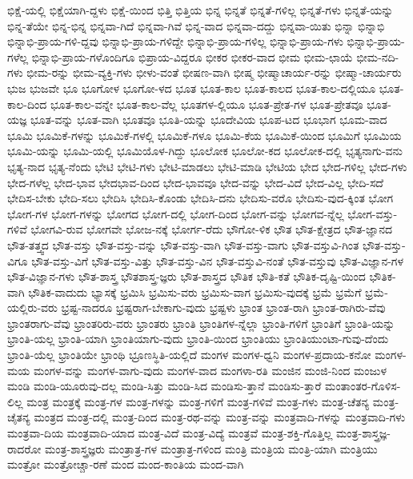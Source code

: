 {ಭಿಕ್ಷೆ-ಯಲ್ಲಿ
ಭಿಕ್ಷೆಯಾಗಿ-ದ್ದಳು
ಭಿಕ್ಷೆ-ಯಿಂದ
ಭಿತ್ತಿ
ಭಿತ್ತಿಯ
ಭಿನ್ನ
ಭಿನ್ನತೆ
ಭಿನ್ನತೆ-ಗಳಿಲ್ಲ
ಭಿನ್ನತೆ-ಗಳು
ಭಿನ್ನತೆ-ಯನ್ನು
ಭಿನ್ನ-ತೆಯೇ
ಭಿನ್ನ-ಭಿನ್ನ
ಭಿನ್ನವಾ-ಗಿದೆ
ಭಿನ್ನವಾ-ಗಿವೆ
ಭಿನ್ನ-ವಾದ
ಭಿನ್ನವಾ-ದದ್ದು
ಭಿನ್ನವಾ-ಯಿತು
ಭಿನ್ನಾ
ಭಿನ್ನಾಭಿ
ಭಿನ್ನಾಭಿ-ಪ್ರಾಯ-ಗಳಿ-ದ್ದವು
ಭಿನ್ನಾಭಿ-ಪ್ರಾಯ-ಗಳಿದ್ದೇ
ಭಿನ್ನಾಭಿ-ಪ್ರಾಯ-ಗಳಿಲ್ಲ
ಭಿನ್ನಾಭಿ-ಪ್ರಾಯ-ಗಳು
ಭಿನ್ನಾಭಿ-ಪ್ರಾಯ-ಗಳೆಲ್ಲ
ಭಿನ್ನಾಭಿ-ಪ್ರಾಯ-ಗಳೊಂದಿಗೂ
ಭಿಪ್ರಾಯ-ವಿದ್ದರೂ
ಭೀಕರ
ಭೀಕರ-ವಾದ
ಭೀಮ
ಭೀಮ-ಛಾಯೆ
ಭೀಮ-ನದಿ-ಗಳು
ಭೀಮ-ರನ್ನು
ಭೀಮ-ವ್ಯಕ್ತಿ-ಗಳು
ಭೀಳು-ವಂತೆ
ಭೀಷಣ-ವಾಗಿ
ಭೀಷ್ಮ
ಭೀಷ್ಮಾಚಾರ್ಯ-ರನ್ನು
ಭೀಷ್ಮಾ-ಚಾರ್ಯರು
ಭುಜ
ಭುಜವೇ
ಭೂ
ಭೂಗೋಳ
ಭೂಗೋ-ಳದ
ಭೂತ
ಭೂತ-ಕಾಲ
ಭೂತ-ಕಾಲದ
ಭೂತ-ಕಾಲ-ದಲ್ಲಿಯೂ
ಭೂತ-ಕಾಲ-ದಿಂದ
ಭೂತ-ಕಾಲ-ವನ್ನೇ
ಭೂತ-ಕಾಲ-ವೆಲ್ಲ
ಭೂತಗಳ-ಲ್ಲಿಯೂ
ಭೂತ-ಪ್ರೇತ-ಗಳ
ಭೂತ-ಪ್ರೇತವೂ
ಭೂತ-ಯಜ್ಞ
ಭೂತ-ವನ್ನು
ಭೂತ-ವಾಗಿ
ಭೂತವೂ
ಭೂತಿ-ಯನ್ನು
ಭೂದೇವಿಯ
ಭೂಪ-ಟದ
ಭೂಭಾಗ
ಭೂಮ-ವಾದ
ಭೂಮಿ
ಭೂಮಿಕೆ-ಗಳನ್ನು
ಭೂಮಿಕೆ-ಗಳಲ್ಲಿ
ಭೂಮಿಕೆ-ಗಳೂ
ಭೂಮಿ-ಕೆಯ
ಭೂಮಿಕೆ-ಯಿಂದ
ಭೂಮಿಗೆ
ಭೂಮಿಯ
ಭೂಮಿ-ಯನ್ನು
ಭೂಮಿ-ಯಲ್ಲಿ
ಭೂಮಿಯೊಳ-ಗಿದ್ದು
ಭೂಲೋಕ
ಭೂಲೋ-ಕದ
ಭೂಲೋಕ-ದಲ್ಲಿ
ಭೃತ್ಯನಾಗು-ವನು
ಭೃತ್ಯ-ನಾದ
ಭೃತ್ಯ-ನೆಂದು
ಭೇಟಿ
ಭೇಟಿ-ಗಳು
ಭೇಟಿ-ಮಾಡಲು
ಭೇಟಿ-ಮಾಡಿ
ಭೇಟಿಯ
ಭೇದ
ಭೇದ-ಗಳಿಲ್ಲ
ಭೇದ-ಗಳು
ಭೇದ-ಗಳೆಲ್ಲ
ಭೇದ-ಭಾವ
ಭೇದಭಾವ-ದಿಂದ
ಭೇದ-ಭಾವವೂ
ಭೇದ-ವನ್ನು
ಭೇದ-ವಿದೆ
ಭೇದ-ವಿಲ್ಲ
ಭೇದಿ-ಸದೆ
ಭೇದಿಸ-ಬೇಕು
ಭೇದಿ-ಸಲು
ಭೇದಿಸಿ
ಭೇದಿಸಿ-ಕೊಂಡು
ಭೇದಿಸಿ-ದನು
ಭೇದಿಸು-ವರೊ
ಭೇದಿಸು-ವುದ-ಕ್ಕಿಂತ
ಭೋಗ
ಭೋಗ-ಗಳ
ಭೋಗ-ಗಳನ್ನು
ಭೋಗದ
ಭೋಗ-ದಲ್ಲಿ
ಭೋಗ-ದಿಂದ
ಭೋಗ-ವನ್ನು
ಭೋಗವ-ನ್ನೆಲ್ಲ
ಭೋಗ-ವಸ್ತು-ಗಳಿವೆ
ಭೋಗವಿ-ರುವ
ಭೋಗವೇ
ಭೋಜ-ನಕ್ಕೆ
ಭೋರ್ಗ-ರೆದು
ಭೌಗೋ-ಳಿಕ
ಭೌತ
ಭೌತ-ಕ್ಷೇತ್ರದ
ಭೌತ-ಜ್ಞಾನದ
ಭೌತ-ತತ್ತ್ವದ
ಭೌತ-ವಸ್ತು
ಭೌತ-ವಸ್ತು-ವನ್ನು
ಭೌತ-ವಸ್ತು-ವಾಗಿ
ಭೌತ-ವಸ್ತು-ವಾಗು
ಭೌತ-ವಸ್ತುವಿ-ಗಿಂತ
ಭೌತ-ವಸ್ತು-ವಿಗೂ
ಭೌತ-ವಸ್ತು-ವಿಗೆ
ಭೌತ-ವಸ್ತು-ವಿತ್ತು
ಭೌತ-ವಸ್ತು-ವಿನ
ಭೌತ-ವಸ್ತುವಿ-ನಂತೆ
ಭೌತ-ವಸ್ತುವು
ಭೌತ-ವಿಜ್ಞಾನ-ಗಳ
ಭೌತ-ವಿಜ್ಞಾನ-ಗಳು
ಭೌತ-ಶಾಸ್ತ್ರ
ಭೌತಶಾಸ್ತ್ರ-ಜ್ಞರು
ಭೌತ-ಶಾಸ್ತ್ರದ
ಭೌತಿಕ
ಭೌತಿ-ಕತೆ
ಭೌತಿಕ-ದೃಷ್ಟಿ-ಯಿಂದ
ಭೌತಿಕ-ವಾಗಿ
ಭೌತಿಕ-ವಾದುದು
ಭ್ಯಾಸಕ್ಕೆ
ಭ್ರಮಿಸಿ
ಭ್ರಮಿಸು-ವರು
ಭ್ರಮಿಸು-ವಾಗ
ಭ್ರಮಿಸು-ವುದಕ್ಕೆ
ಭ್ರಮೆ
ಭ್ರಮೆಗೆ
ಭ್ರಮೆ-ಯಲ್ಲಿರು-ವರು
ಭ್ರಷ್ಟ-ನಾದರೂ
ಭ್ರಷ್ಟರಾಗ-ಬೇಕಾಗು-ವುದು
ಭ್ರಷ್ಟಳು
ಭ್ರಾಂತ
ಭ್ರಾಂತ-ರಾಗಿ
ಭ್ರಾಂತ-ರಾಗಿರು-ವೆವು
ಭ್ರಾಂತರಾಗು-ವೆವು
ಭ್ರಾಂತರಿರು-ವರು
ಭ್ರಾಂತರು
ಭ್ರಾಂತಿ
ಭ್ರಾಂತಿಗಳ-ನ್ನೆಲ್ಲಾ
ಭ್ರಾಂತಿ-ಗಳಿಗೆ
ಭ್ರಾಂತಿಗೆ
ಭ್ರಾಂತಿ-ಯನ್ನು
ಭ್ರಾಂತಿ-ಯಲ್ಲ
ಭ್ರಾಂತಿ-ಯಾಗಿ
ಭ್ರಾಂತಿಯಾಗು-ವುದು
ಭ್ರಾಂತಿ-ಯಿಂದ
ಭ್ರಾಂತಿಯು
ಭ್ರಾಂತಿಯುಂಟಾ-ಗುವು-ದೆಂದು
ಭ್ರಾಂತಿ-ಯೆಲ್ಲ
ಭ್ರಾಂತಿಯೇ
ಭ್ರಾಂಥಿ
ಭ್ರೂಣಸ್ಥಿತಿ-ಯಲ್ಲಿದೆ
ಮಂಗಳ
ಮಂಗಳ-ಧ್ವನಿ
ಮಂಗಳ-ಪ್ರದಾಯ-ಕನೋ
ಮಂಗಳ-ಮಯ
ಮಂಗಳ-ವನ್ನು
ಮಂಗಳ-ವಾಗು-ವುದು
ಮಂಗಳ-ವಾದ
ಮಂಗಳಾ-ರತಿ
ಮಂಜಿನ
ಮಂಜಿ-ನಿಂದ
ಮಂಜುಳ
ಮಂಡಿ
ಮಂಡಿ-ಯೂರುವು-ದಲ್ಲ
ಮಂಡಿ-ಸಿತ್ತು
ಮಂಡಿ-ಸಿದ
ಮಂಡಿಸು-ತ್ತಾನೆ
ಮಂಡಿಸು-ತ್ತಾರೆ
ಮಂತಾಂತರ-ಗೊಳಿಸ-ಲಿಲ್ಲ
ಮಂತ್ರ
ಮಂತ್ರಕ್ಕೆ
ಮಂತ್ರ-ಗಳ
ಮಂತ್ರ-ಗಳನ್ನು
ಮಂತ್ರ-ಗಳಿಗೆ
ಮಂತ್ರ-ಗಳಿವೆ
ಮಂತ್ರ-ಗಳು
ಮಂತ್ರ-ಚೆತನ್ಯ
ಮಂತ್ರ-ಚೈತನ್ಯ
ಮಂತ್ರದ
ಮಂತ್ರ-ದಲ್ಲಿ
ಮಂತ್ರ-ದಿಂದ
ಮಂತ್ರ-ರಥ-ವನ್ನು
ಮಂತ್ರ-ವನ್ನು
ಮಂತ್ರವಾದಿ-ಗಳನ್ನು
ಮಂತ್ರವಾದಿ-ಗಳು
ಮಂತ್ರವಾ-ದಿಯ
ಮಂತ್ರವಾದಿ-ಯಾದ
ಮಂತ್ರ-ವಿದೆ
ಮಂತ್ರ-ವಿದ್ಯೆ
ಮಂತ್ರವೆ
ಮಂತ್ರ-ಶಕ್ತಿ-ಗೊತ್ತಿಲ್ಲ
ಮಂತ್ರ-ಶಾಸ್ತ್ರಜ್ಞ-ರಾದರೋ
ಮಂತ್ರ-ಶಾಸ್ತ್ರಜ್ಞರು
ಮಂತ್ರಾತ್ರ-ಗಳ
ಮಂತ್ರಾತ್ರ-ಗಳಿಂದ
ಮಂತ್ರಿ
ಮಂತ್ರಿಯ
ಮಂತ್ರಿ-ಯಾಗಿ
ಮಂತ್ರಿಯು
ಮಂತ್ರೋ
ಮಂತ್ರೋಚ್ಚಾ-ರಣೆ
ಮಂದ
ಮಂದ-ಕಾಂತಿಯ
ಮಂದ-ವಾಗಿ
}
